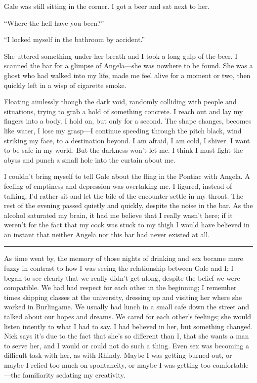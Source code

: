 Gale was still sitting in the corner. I got a beer and sat next to her.

``Where the hell have you been?''

``I locked myself in the bathroom by accident.''

She uttered something under her breath and I took a long gulp of the
beer. I scanned the bar for a glimpse of Angela---she was nowhere to be
found. She was a ghost who had walked into my life, made me feel alive
for a moment or two, then quickly left in a wisp of cigarette smoke.

Floating aimlessly though the dark void, randomly colliding with people
and situations, trying to grab a hold of something concrete. I reach out
and lay my fingers into a body. I hold on, but only for a second. The
shape changes, becomes like water, I lose my grasp---I continue speeding
through the pitch black, wind striking my face, to a destination beyond.
I am afraid, I am cold, I shiver. I want to be safe in my world. But the
darkness won't let me. I think I must fight the abyss and punch a small
hole into the curtain about me.

I couldn't bring myself to tell Gale about the fling in the Pontiac with
Angela. A feeling of emptiness and depression was overtaking me. I
figured, instead of talking, I'd rather sit and let the bile of the
encounter settle in my throat. The rest of the evening passed quietly
and quickly, despite the noise in the bar. As the alcohol saturated my
brain, it had me believe that I really wasn't here; if it weren't for
the fact that my cock was stuck to my thigh I would have believed in an
instant that neither Angela nor this bar had never existed at all.

\begin{center}\rule{0.5\linewidth}{0.5pt}\end{center}

As time went by, the memory of those nights of drinking and sex became
more fuzzy in contrast to how I was seeing the relationship between Gale
and I; I began to see clearly that we really didn't get along, despite
the belief we were compatible. We had had respect for each other in the
beginning; I remember times skipping classes at the university, dressing
up and visiting her where she worked in Burlingame. We usually had lunch
in a small cafe down the street and talked about our hopes and dreams.
We cared for each other's feelings; she would listen intently to what I
had to say. I had believed in her, but something changed. Nick says it's
due to the fact that she's so different than I, that she wants a man to
serve her, and I would or could not do such a thing. Even sex was
becoming a difficult task with her, as with Rhindy. Maybe I was getting
burned out, or maybe I relied too much on spontaneity, or maybe I was
getting too comfortable---the familiarity sedating my creativity.

